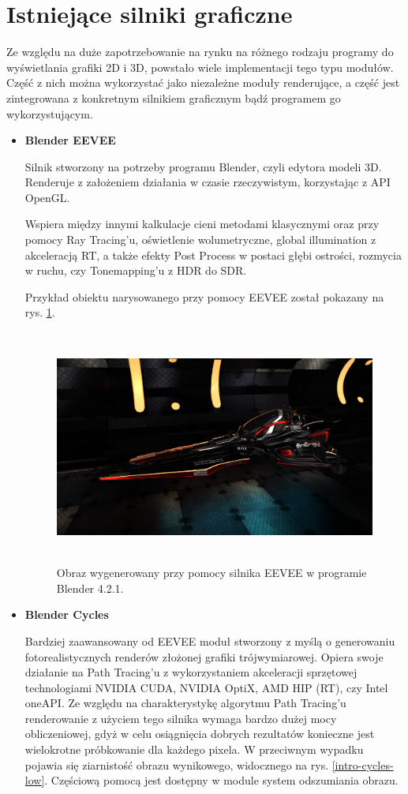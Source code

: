 \section{Istniejące silniki graficzne}

Ze względu na duże zapotrzebowanie na rynku na różnego rodzaju programy do wyświetlania grafiki 2D i 3D, powstało wiele implementacji tego typu modułów. Część z nich można wykorzystać jako niezależne moduły renderujące, a część jest zintegrowana z konkretnym silnikiem graficznym bądź programem go wykorzystującym.

\begin{itemize}
	\item \textbf{Blender EEVEE}

	Silnik stworzony na potrzeby programu Blender, czyli edytora modeli 3D. Renderuje z założeniem działania w czasie rzeczywistym, korzystając z API OpenGL.

	Wspiera między innymi kalkulacje cieni metodami klasycznymi oraz przy pomocy Ray Tracing'u, oświetlenie wolumetryczne, global illumination z akceleracją RT, a także efekty Post Process w postaci głębi ostrości, rozmycia w ruchu, czy Tonemapping'u z HDR do SDR.

	Przykład obiektu narysowanego przy pomocy EEVEE został pokazany na rys. \ref{intro-eevee}.

	\begin{figure}[htbp]
		\centering
		\includegraphics[width=5.41667in,height=3.03651in]{images/14_eevee.png}
		\caption{Obraz wygenerowany przy pomocy silnika EEVEE w programie Blender 4.2.1.}
		\label{intro-eevee}
	\end{figure}

	\item \textbf{Blender Cycles}

	Bardziej zaawansowany od EEVEE moduł stworzony z myślą o generowaniu fotorealistycznych renderów złożonej grafiki trójwymiarowej. Opiera swoje działanie na Path Tracing'u z wykorzystaniem akceleracji sprzętowej technologiami NVIDIA CUDA, NVIDIA OptiX, AMD HIP (RT), czy Intel oneAPI. Ze względu na charakterystykę algorytmu Path Tracing'u renderowanie z użyciem tego silnika wymaga bardzo dużej mocy obliczeniowej, gdyż w celu osiągnięcia dobrych rezultatów konieczne jest wielokrotne próbkowanie dla każdego pixela. W przeciwnym wypadku pojawia się ziarnistość obrazu wynikowego, widocznego na rys. \ref{intro-cycles-low}. Częściową pomocą jest dostępny w module system odszumiania obrazu.


\end{itemize}
